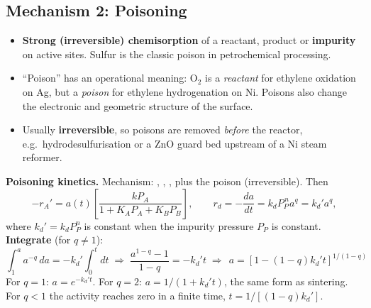 \documentclass[11pt]{article}
\begin{document}
\subsection{Mechanism 2: Poisoning}
\begin{itemize}
\item \textbf{Strong (irreversible) chemisorption} of a reactant, product or \textbf{impurity} on active sites.
Sulfur is the classic poison in petrochemical processing.
\item ``Poison'' has an operational meaning: O$_2$ is a \emph{reactant} for ethylene oxidation on Ag, but a \emph{poison} for
ethylene hydrogenation on Ni. Poisons also change the electronic and geometric structure of the surface.
\item Usually \textbf{irreversible}, so poisons are removed \emph{before} the reactor, e.g.\ hydrodesulfurisation or a
ZnO guard bed upstream of a Ni steam reformer.
\end{itemize}
\begin{center}
\end{center}

\textbf{Poisoning kinetics.} Mechanism: , , , plus the poison
 (irreversible). Then
\[
-r_A'=a(t)\left[\frac{kP_A}{1+K_AP_A+K_BP_B}\right],\qquad
r_d=-\frac{da}{dt}=k_dP_P^{\,n}a^q=k_d'a^q,
\]
where $k_d'=k_dP_P^n$ is constant when the impurity pressure $P_P$ is constant.
\textbf{Integrate} (for $q\neq1$):
\[
\int_1^a a^{-q}\,da=-k_d'\int_0^tdt\;\Rightarrow\;\frac{a^{1-q}-1}{1-q}=-k_d't\;\Rightarrow\;
\boxed{\,a=\left[1-(1-q)k_d't\right]^{1/(1-q)}\,}
\]
For $q=1$: $a=e^{-k_d't}$. For $q=2$: $a=1/(1+k_d't)$, the same form as sintering. For $q<1$ the activity reaches
zero in a finite time, $t=1/[(1-q)k_d']$.
\end{document}

